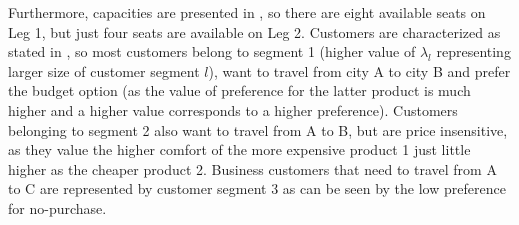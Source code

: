 Furthermore, capacities are presented in , so there are eight available seats on Leg 1, but just four seats are available on Leg 2. Customers are characterized as stated in , so most customers belong to segment 1 (higher value of $\lambda_l$ representing larger size of customer segment $l$), want to travel from city A to city B and prefer the budget option (as the value of preference for the latter product is much higher and a higher value corresponds to a higher preference). Customers belonging to segment 2 also want to travel from A to B, but are price insensitive, as they value the higher comfort of the more expensive product 1 just little higher as the cheaper product 2. Business customers that need to travel from A to C are represented by customer segment 3 as can be seen by the low preference for no-purchase. 

